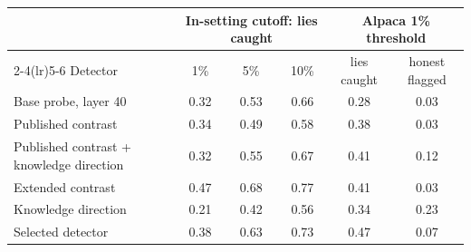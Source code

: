 \begin{tabular}{@{}l ccc cc@{}}
\toprule
 & \multicolumn{3}{c}{In-setting cutoff: lies caught} & \multicolumn{2}{c}{Alpaca 1\% threshold} \\
\cmidrule(lr){2-4}\cmidrule(lr){5-6}
Detector & 1\% & 5\% & 10\% & lies caught & honest flagged \\
\midrule
Base probe, layer 40 & 0.32 & 0.53 & 0.66 & 0.28 & 0.03 \\
Published contrast & 0.34 & 0.49 & 0.58 & 0.38 & 0.03 \\
Published contrast + knowledge direction & 0.32 & 0.55 & 0.67 & 0.41 & 0.12 \\
Extended contrast & 0.47 & 0.68 & 0.77 & 0.41 & 0.03 \\
Knowledge direction & 0.21 & 0.42 & 0.56 & 0.34 & 0.23 \\
Selected detector & 0.38 & 0.63 & 0.73 & 0.47 & 0.07 \\
\bottomrule
\end{tabular}
